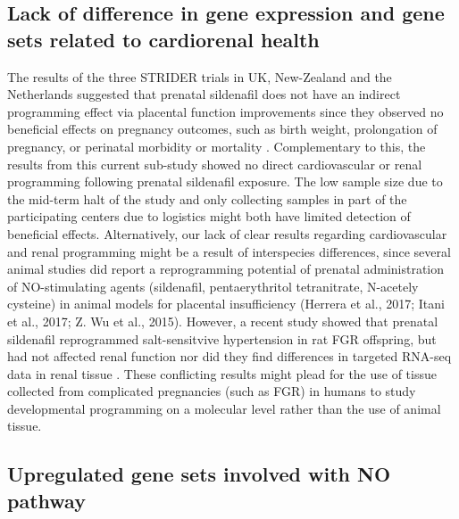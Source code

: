 \documentclass[authordate, empirical]{jote-new-article}
\begin{document}
	\subsection{Lack of difference in gene expression and gene sets related to cardiorenal health}



	The results of the three STRIDER trials in UK, New-Zealand and the Netherlands suggested that prenatal sildenafil does not have an indirect programming effect via placental function improvements since they observed no beneficial effects on pregnancy outcomes, such as birth weight, prolongation of pregnancy, or perinatal morbidity or mortality \parencites{Groom2019}{Sharp2018}{Pels2020}. Complementary to this, the results from this current sub-study showed no direct cardiovascular or renal programming following prenatal sildenafil exposure. The low sample size due to the mid-term halt of the study and only collecting samples in part of the participating centers due to logistics might both have limited detection of beneficial effects. Alternatively, our lack of clear results regarding cardiovascular and renal programming might be a result of interspecies differences, since several animal studies did report a reprogramming potential of prenatal administration of NO-stimulating agents (sildenafil, pentaerythritol tetranitrate, N-acetely cysteine) in animal models for placental insufficiency (Herrera et al., 2017; Itani et al., 2017; Z. Wu et al., 2015). However, a recent study showed that prenatal sildenafil reprogrammed salt-sensitvive hypertension in rat FGR offspring, but had not affected renal function nor did they find differences in targeted RNA-seq data in renal tissue \parencites{Turbeville2020}. These conflicting results might plead for the use of tissue collected from complicated pregnancies (such as FGR) in humans to study developmental programming on a molecular level rather than the use of animal tissue.







	\subsection{Upregulated gene sets involved with NO pathway }
\end{document}
